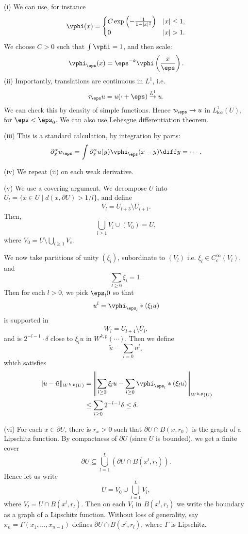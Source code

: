 \documentclass[12pt]{article}
\begin{document}
\begin{proofbox}
	

	(i) We can use, for instance
	\[
	\vphi(x) = 
	\begin{cases}
		C \exp \left( - \frac{1}{1 - |x|^2} \right) & |x| \leq 1, \\
			0 & |x| > 1.
	\end{cases}
	\]
	We choose $C > 0$ such that $\int \vphi = 1$, and then scale:
	\[
	\vphi_\eps(x) = \eps^{-k} \vphi \left( \frac{x}{\eps} \right).
	\]
	(ii) Importantly, translations are continuous in $L^1$, i.e.
	\[
		\tau_\eps u = u(\cdot + \eps) \overset{L^1}\to u.
	\]
	We can check this by density of simple functions. Hence $u_\eps \to u$ in $L^1_{\mathrm{loc}}(U)$, for $\eps < \eps_0$. We can also use Lebesgue differentiation theorem.

	(iii) This is a standard calculation, by integration by parts:
	\[
	\partial^{\alpha}_x u_\eps = \int \partial^{\alpha}_x u(y) \vphi_\eps(x - y) \diff y = \cdots.
	\]

	(iv) We repeat (ii) on each weak derivative.

	(v) We use a covering argument. We decompose $U$ into $U_{l} = \{x \in U \mid d(x, \partial U) > 1/l\}$, and define
	\[
	V_l = U_{l + 3} \setminus \overline{U_{l+1}}.
	\]
	Then,
	\[
	\bigcup_{l \geq 1} V_l \cup (V_0) = U,
	\]
	where $V_0 = U \setminus \bigcup_{l \geq 1} V_c$.

	We now take partitions of unity $(\xi_l)$, subordinate to $(V_l)$ i.e. $\xi_l \in C_c^\infty(V_l)$, and
	\[
	\sum_{l \geq 0} \xi_l = 1.
	\]
	Then for each $l > 0$, we pick $\eps_l  0$ so that
	\[
	u^l = \vphi_{\eps_l} \ast (\xi_l u)
	\]
	is supported in
	\[
	W_l = U_{l + 4} \setminus \overline{U_l},
	\]
	and is $2^{-l-1} \cdot \delta$ close to $\xi_l u$ in $W^{k, p}(\cdots)$. Then we define
	\[
	\tilde u = \sum_{l = 0} u^{l},
	\]
	which satisfies
	\begin{align*}
		\|u - \tilde u\|_{W^{k, p}(U)} &= \left\| \sum_{l \geq 0} \xi_{l} u - \sum_{l \geq 0} \vphi_{\eps_l} \ast (\xi_l u) \right\|_{W^{k, p}(U)} \\
					       &\leq \sum_{l \geq 0} 2^{-l-1} \delta \leq \delta.
	\end{align*}

	(vi) For each $x \in \partial U$, there is $r_x > 0$ such that $\partial U \cap B(x, r_0)$ is the graph of a Lipschitz function. By compactness of $\partial U$ (since $U$ is bounded), we get a finite cover
	\[
	\partial U \subseteq \bigcup_{l = 1}^L (\partial U \cap B(x^l, r_l)).
	\]
	Hence let us write
	\[
	U = V_0 \cup \bigcup_{l = 1}^L V_l,
	\]
	where $V_l = U \cap B(x^l, r_l)$. Then on each $V_l$ in $B(x^l, r_l)$ we write the boundary as a graph of a Lipschitz function. Without loss of generality, say $x_n = \Gamma(x_1, \ldots, x_{n-1})$ defines $\partial U \cap B(x^l, r_l)$, where $\Gamma$ is Lipschitz.


\end{proofbox}
\end{document}
